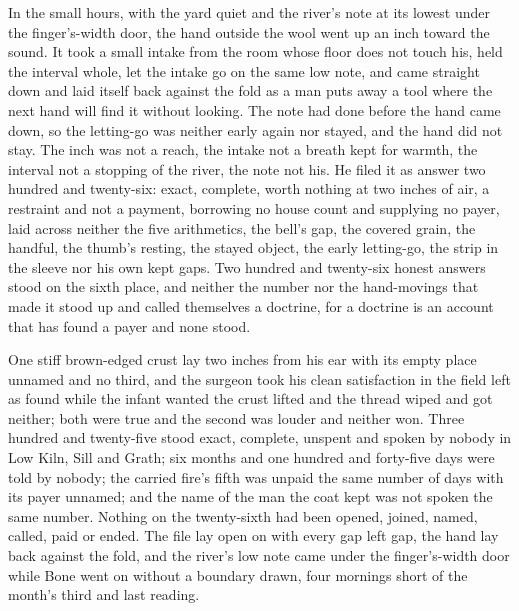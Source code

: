 In the small hours, with the yard quiet and the river's note at its lowest under the finger's-width door, the hand outside the wool went up an inch toward the sound. It took a small intake from the room whose floor does not touch his, held the interval whole, let the intake go on the same low note, and came straight down and laid itself back against the fold as a man puts away a tool where the next hand will find it without looking. The note had done before the hand came down, so the letting-go was neither early again nor stayed, and the hand did not stay. The inch was not a reach, the intake not a breath kept for warmth, the interval not a stopping of the river, the note not his. He filed it as answer two hundred and twenty-six: exact, complete, worth nothing at two inches of air, a restraint and not a payment, borrowing no house count and supplying no payer, laid across neither the five arithmetics, the bell's gap, the covered grain, the handful, the thumb's resting, the stayed object, the early letting-go, the strip in the sleeve nor his own kept gaps. Two hundred and twenty-six honest answers stood on the sixth place, and neither the number nor the hand-movings that made it stood up and called themselves a doctrine, for a doctrine is an account that has found a payer and none stood.

One stiff brown-edged crust lay two inches from his ear with its empty place unnamed and no third, and the surgeon took his clean satisfaction in the field left as found while the infant wanted the crust lifted and the thread wiped and got neither; both were true and the second was louder and neither won. Three hundred and twenty-five stood exact, complete, unspent and spoken by nobody in Low Kiln, Sill and Grath; six months and one hundred and forty-five days were told by nobody; the carried fire's fifth was unpaid the same number of days with its payer unnamed; and the name of the man the coat kept was not spoken the same number. Nothing on the twenty-sixth had been opened, joined, named, called, paid or ended. The file lay open on  with every gap left gap, the hand lay back against the fold, and the river's low note came under the finger's-width door while Bone went on without a boundary drawn, four mornings short of the month's third and last reading.
